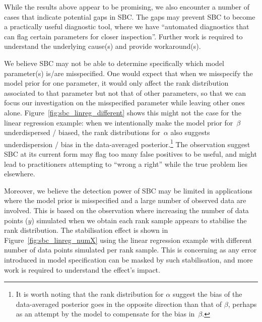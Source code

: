 \documentclass[twoside]{article}
\begin{document}
While the results above appear to be promising, we also encounter a number of cases that indicate potential gaps in SBC. The gaps may prevent SBC to become a practically useful diagnostic tool, where we have ``automated diagnostics that can flag certain parameters for closer inspection''\citep{talts2018validating}. Further work is required to understand the underlying cause(s) and provide workaround(s).

We believe SBC may not be able to determine specifically which model parameter(s) is/are misspecified. One would expect that when we misspecify the model prior for one parameter, it would only affect the rank distribution associated to that parameter but not that of other parameters, so that we can focus our investigation on the misspecified parameter while leaving other ones alone. Figure~\ref{fig:sbc_linreg_different} shows this might not the case for the linear regression example: when we intentionally make the model prior for~$\beta$ underdispersed / biased, the rank distributions for~$\alpha$ also suggests underdispersion / bias in the data-averaged posterior.\footnote{It is worth noting that the rank distribution for $\alpha$ suggest the bias of the data-averaged posterior goes in the opposite direction than that of $\beta$, perhaps as an attempt by the model to compensate for the bias in~$\beta$.} The observation suggest SBC at its current form may flag too many false positives to be useful, and might lead to practitioners attempting to ``wrong a right'' while the true problem lies elsewhere.

Moreover, we believe the detection power of SBC may be limited in applications where the model prior is misspecified and a large number of observed data are involved. This is based on the observation where increasing the number of data points ($y$) simulated when we obtain each rank sample appears to stabilise the rank distribution. The stabilisation effect is shown in Figure~\ref{fig:sbc_linreg_numX} using the linear regression example with different number of data points simulated per rank sample. This is concerning as any error introduced in model specification can be masked by such stabilisation, and more work is required to understand the effect's impact.
\end{document}
